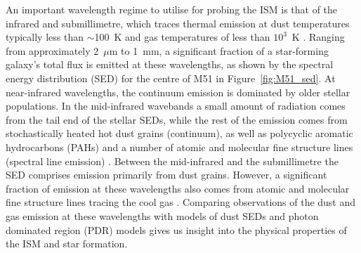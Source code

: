 An important wavelength regime to utilise for probing the ISM is that of the infrared and submillimetre, which traces thermal emission at dust temperatures typically less than $\sim$100~K  and gas temperatures of less than $10^{3}$~K \citep{2005pcim.book.....T}.  Ranging from approximately 2~$\mu$m to 1~mm, a significant fraction of a star-forming galaxy's total flux is emitted at these wavelengths, as shown by the spectral energy distribution (SED) for the centre of M51 in Figure~\ref{fig:M51_sed}.  At near-infrared wavelengths, the continuum emission is dominated by older stellar populations.  In the mid-infrared wavebands a small amount of radiation comes from the tail end of the stellar SEDs, while the rest of the emission comes from stochastically heated hot dust grains (continuum), as well as polycyclic aromatic hydrocarbons (PAHs) and a number of atomic and molecular fine structure lines (spectral line emission) \citep[e.g.][]{2007ApJ...657..810D}.  Between the mid-infrared and the submillimetre the SED comprises emission primarily from dust grains.  However, a significant fraction of emission at these wavelengths also comes from atomic and molecular fine structure lines tracing the cool gas \citep{1999ApJ...527..795K}.  Comparing observations of the dust and gas emission at these wavelengths with models of dust SEDs \citep[e.g.][]{2001ApJ...549..215D,2003A&A...407..159G,2007ApJ...663..866D,2011A&A...536A..88G} and photon dominated region (PDR) models \citep[e.g.][]{1985ApJ...291..722T, 1990ApJ...358..116W, 1991ApJ...377..192H, 1999ApJ...527..795K, 2006ApJ...644..283K,2006A&A...451..917R} gives us insight into the physical properties of the ISM and star formation.

